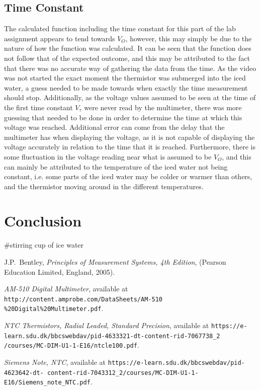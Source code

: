\documentclass[a4,11pt]{article}
\begin{document}
\subsection{Time Constant}
The calculated function including the time constant for this part of the lab assignment appears to tend towards $V_O$, however, this may simply be due to the nature of how the function was calculated. It can be seen that the function does not follow that of the expected outcome, and this may be attributed to the fact that there was no accurate way of gathering the data from the time. As the video was not started the exact moment the thermistor was submerged into the iced water, a guess needed to be made towards when exactly the time measurement should stop. Additionally, as the voltage values assumed to be seen at the time of the first time constant $V_\tau$ were never read by the multimeter, there was more guessing that needed to be done in order to determine the time at which this voltage was reached. Additional error can come from the delay that the multimeter has when displaying the voltage, as it is not capable of displaying the voltage accurately in relation to the time that it is reached. Furthermore, there is some fluctuation in the voltage reading near what is assumed to be $V_O$, and this can mainly be attributed to the temperature of the iced water not being constant, i.e. some parts of the iced water may be colder or warmer than others, and the thermistor moving around in the different temperatures.
\section{Conclusion}
\#stirring cup of ice water
\onecolumn
\begin{thebibliography}{99}
	J.P.\ Bentley, \textit{Principles of Measurement Systems, 4th Edition},
	(Pearson Education Limited, England, 2005).
	
	 \emph{AM-510 Digital Multimeter},   available at
	\texttt{http://content.amprobe.com/DataSheets/AM-510
		\%20Digital\%20Multimeter.pdf}.	
	
	 \emph{NTC Thermistors, Radial Leaded, Standard Precision},   available at
	\texttt{https://e-learn.sdu.dk/bbcswebdav/pid-4633321-dt-content-rid-7067738\_2
		/courses/MC-DIM-U1-1-E16/ntcle100.pdf}.
	
	 \emph{Siemens Note, NTC},   available at
	\texttt{https://e-learn.sdu.dk/bbcswebdav/pid-4623642-dt-
		content-rid-7043312\_2/courses/MC-DIM-U1-1-E16/Siemens\_note\_NTC.pdf}.
\end{thebibliography}
\appendix
\end{document}
